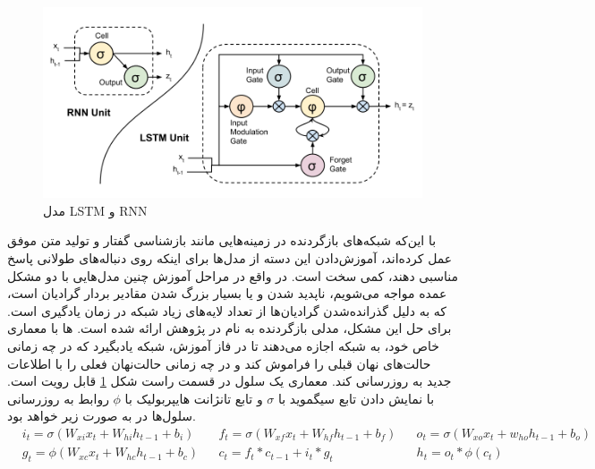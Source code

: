 \begin{figure}[ht!]
	\centering
	\includegraphics[width=120mm]{images/rnn-lstm.png}
	\caption{مدل LSTM و RNN \label{rnn-lstm}\cite{Donahue2015}}
\end{figure}

با این‌که شبکه‌های بازگردنده در زمینه‌هایی مانند بازشناسی گفتار و تولید متن موفق عمل کرده‌اند، آموزش‌‌دادن این دسته از مدل‌ها برای اینکه روی دنباله‌های طولانی پاسخ مناسبی دهند، کمی سخت است. در واقع در مراحل آموزش چنین مدل‌هایی با دو مشکل عمده مواجه می‌شویم، ناپدید شدن 
و یا بسیار بزرگ شدن 
مقادیر بردار گرادیان است، که به دلیل گذرانده‌شدن گرادیان‌ها از تعداد لایه‌های زیاد شبکه در زمان یادگیری است. برای حل این مشکل، مدلی بازگردنده به نام 
در پژوهش 
\cite{hochreiter1997long}
 ارائه شده است. ها با معماری خاص خود، به شبکه اجازه می‌دهند تا در فاز آموزش، شبکه یاد‌بگیرد که در چه زمانی حالت‌های نهان قبلی را فراموش کند و در چه زمانی حالت‌نهان فعلی را با اطلاعات جدید به روز‌رسانی کند. معماری یک سلول
در قسمت راست شکل  \ref{rnn-lstm} قابل رویت است. با نمایش دادن تابع سیگموید با $\sigma$ و تابع تانژانت هایپربولیک با $\phi$ روابط به روز‌رسانی سلول‌ها در  به صورت زیر خواهد بود.
\begin{align*}
	& i_t = \sigma(W_{xi}x_t + W_{hi}h_{t-1}‌ +‌ b_i )& & f_t = \sigma(W_{xf}x_t +‌W_{hf}h_{t-1}‌‌+b_f) &&‌ o_t = \sigma(W_{xo}x_t‌+‌w_{ho}h_{t-1} + b_o) \\
	& g_t = \phi(W_{xc}x_t + W_{hc}h_{t-1} + b_c) & & c_t = f_t  * c_{t-1}‌+ i_t * g_t  && h_t = o_t  * \phi(c_t)
\end{align*}

